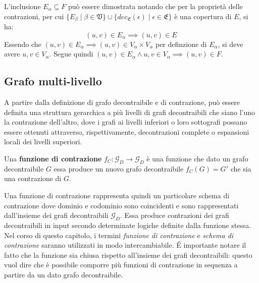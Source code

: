     L'inclusione $E_\alpha \subseteq F$ pu\`o essere dimostrata notando che per la propriet\`a delle contrazioni,
    per cui $\{ E_\beta \mid \beta \in \mathfrak{V}\} \cup
    \{dec_{\mathfrak{E}}(\epsilon) \mid \epsilon \in \mathfrak{E}\} $ \`e una copertura di $E$, si ha:
    \begin{equation*}
        (u, v) \in E_\alpha \implies (u, v) \in E
    \end{equation*}
    Essendo che  $(u, v) \in E_\alpha \implies (u, v) \in V_\alpha \times V_\alpha$ per definzione di $E_\alpha$, si
    deve avere $u, v \in V_\alpha$. Segue quindi $(u, v) \in E_\alpha \land u,v \in V_\alpha \implies (u, v) \in F$.

    \newpage

    \subsection{Grafo multi-livello}\label{subsec:grafo-multi-livello}

A partire dalla definizione di grafo decontraibile e di contrazione, pu\`o essere definita una struttura gerarchica
    a pi\`u livelli di grafi decontraibili che siano l'uno la contrazione dell'altro, dove i grafi ai livelli inferiori
    o loro sottografi possano essere ottenuti attraverso, rispettivamente, decontrazioni complete o espansioni locali
    dei livelli superiori.


    \begin{definition} 
    Una \textbf{funzione di contrazione} $f_C : \mathcal{G}_D \rightarrow \mathcal{G}_D$ \`e una funzione che dato un
    grafo decontraibile $G$ essa produce un nuovo grafo decontraibile $f_C(G) = G'$ che sia una contrazione di $G$.
    \end{definition}

    Una funzione di contrazione rappresenta quindi un particolare schema di contrazione dove dominio e codominio sono
    coincidenti e sono rappresentati dall'insieme dei grafi decontraibili $\mathcal{G}_D$. Essa produce contrazioni
    dei grafi decontraibili in input secondo determinate logiche definite dalla funzione stessa.
    Nel corso di questo capitolo, i termini \textit{funzione di contrazione} e \textit{schema di contrazione}
    saranno utilizzati in modo intercambiabile. \newline
    \'E importante notare il fatto che la funzione sia chiusa rispetto all'insieme dei grafi decontraibili: questo vuol
    dire che \`e possibile comporre pi\`u funzioni di contrazione in sequenza a partire da un dato grafo decontraibile.
    \newline

